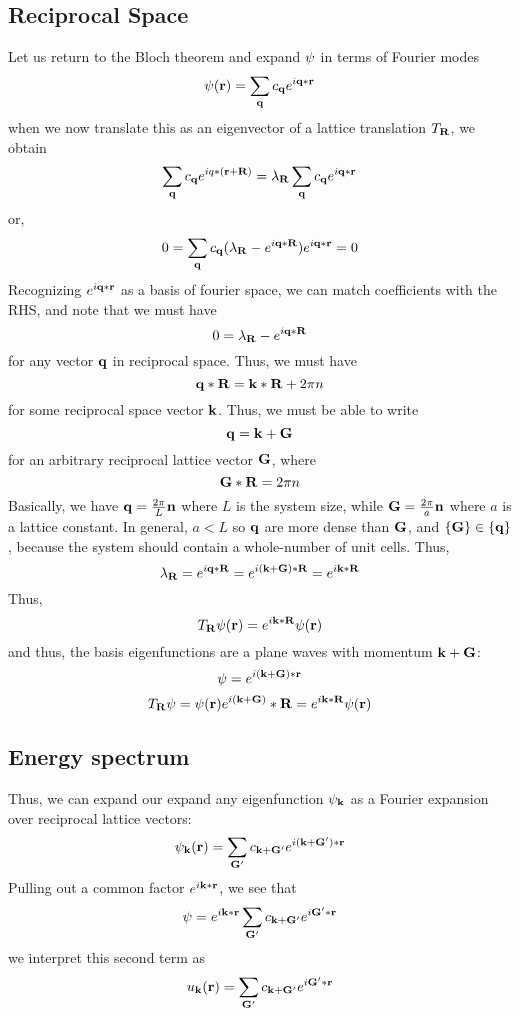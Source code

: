 \subsection{Reciprocal Space}
Let us return to the Bloch theorem and expand \(\psi\) in terms of Fourier modes
\[\psi(\mathbf{r}) = \sum_{\mathbf{q}}c_{\mathbf{q}} e^{i\mathbf{q}*\mathbf{r}}\]
when we now translate this as an eigenvector of a lattice translation \(T_{\mathbf{R}}\), we obtain
\[\sum_{\mathbf{q}}c_{\mathbf{q}}e^{iq*(\mathbf{r}+\mathbf{R})} = \lambda_{\mathbf{R}}\sum_{\mathbf{q}}c_{\mathbf{q}}e^{i\mathbf{q}*\mathbf{r}}\]
or,
\[0 = \sum_{\mathbf{q}}c_{\mathbf{q}}(\lambda_{\mathbf{R}}-e^{i\mathbf{q}*\mathbf{R}})e^{i\mathbf{q}*\mathbf{r}} = 0\]
Recognizing \(e^{i\mathbf{q}*\mathbf{r}}\) as a basis of fourier space, we can match coefficients with the RHS, and note that we must have
\[0=\lambda_{\mathbf{R}}-e^{i\mathbf{q}*\mathbf{R}}\]
for any vector \(\mathbf{q}\) in reciprocal space. Thus, we must have 
\[\mathbf{q}*\mathbf{R} = \mathbf{k}*\mathbf{R}+2\pi n\]
for some reciprocal space vector \(\mathbf{k}\). Thus, we must be able to write 
\[\mathbf{q} =\mathbf{k} +\mathbf{G}\]
for an arbitrary reciprocal lattice vector \(\mathbf{G}\), where
\[\mathbf{G}*\mathbf{R} = 2\pi n\]
Basically, we have \(\mathbf{q} = \frac{2\pi}{L}\mathbf{n}\) where \(L\) is the system size, while \(\mathbf{G} = \frac{2\pi}{a}\mathbf{n}\) where \(a\) is a lattice constant. In general, \(a<L\) so \(\mathbf{q}\) are more dense than \(\mathbf{G}\), and \(\{\mathbf{G}\}\in \{\mathbf{q}\}\), because the system should contain a whole-number of unit cells.
Thus, 
\[\lambda_{\mathbf{R}} = e^{i\mathbf{q}*\mathbf{R}} = e^{i(\mathbf{k}+\mathbf{G})*\mathbf{R}} = e^{i\mathbf{k}*\mathbf{R}}\]
Thus,
\[T_{\mathbf{R}}\psi(\mathbf{r}) = e^{i\mathbf{k} *\mathbf{R}} \psi(\mathbf{r})\]
and thus, the basis eigenfunctions are a plane waves with momentum \(\mathbf{k}+\mathbf{G}\):
\[\psi = e^{i(\mathbf{k}+\mathbf{G})*\mathbf{r}}\]
\[T_{\mathbf{R}}\psi = \psi(\mathbf{r}) e^{i(\mathbf{k}+\mathbf{G})}*\mathbf{R} = e^{i\mathbf{k}*\mathbf{R}}\psi(\mathbf{r})\]

\subsection{Energy spectrum}
Thus, we can expand our expand any eigenfunction \(\psi_{\mathbf{k}}\) as a Fourier expansion over reciprocal lattice vectors:
\begin{equation}
	\psi_{\mathbf{k}}(\mathbf{r}) = \sum_{\mathbf{G}'} c_{\mathbf{k}+\mathbf{G}'}e^{i(\mathbf{k}+\mathbf{G}')*\mathbf{r}}
\end{equation}
Pulling out a common factor \(e^{i\mathbf{k}*\mathbf{r}}\), we see that
\[\psi = e^{i\mathbf{k}*\mathbf{r}}\sum_{\mathbf{G}'}c_{\mathbf{k}+\mathbf{G}'}e^{i\mathbf{G}'*\mathbf{r}} \]
we interpret this second term as
\begin{equation}
	u_{\mathbf{k}}(\mathbf{r}) = \sum_{\mathbf{G}'} c_{\mathbf{k}+\mathbf{G}'} e^{i\mathbf{G}'*\mathbf{r}}
\end{equation}

